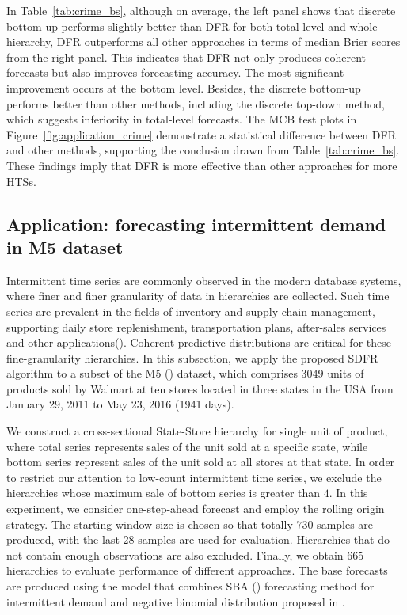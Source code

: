 \documentclass[a4paper,review,12pt,authoryear]{elsarticle}
\theoremstyle{definition}
\begin{document}
     In Table~\ref{tab:crime_bs},  although on average, the left panel shows that discrete bottom-up performs slightly better than DFR for both total level and whole hierarchy, DFR outperforms all other approaches in terms of median Brier scores from the right panel. This indicates that DFR not only produces coherent forecasts but also improves forecasting accuracy. The most significant improvement occurs at the bottom level. Besides, the discrete bottom-up performs better than other methods, including the discrete top-down method, which suggests inferiority in total-level forecasts. The MCB test plots in Figure~\ref{fig:application_crime} demonstrate a statistical difference between DFR and other methods, supporting the conclusion drawn from Table~\ref{tab:crime_bs}. These findings imply that DFR is more effective than other approaches for more HTSs.

     \subsection{Application: forecasting intermittent demand in M5 dataset}

     Intermittent time series are commonly observed in the modern database systems, where finer and finer granularity of data in hierarchies are collected. 
     Such time series are prevalent in the fields of inventory and supply chain management, supporting daily store replenishment, transportation plans, after-sales services and other applications(\citealp{babaiDemandForecastingSupply2022}).
     Coherent predictive distributions are critical for these fine-granularity hierarchies. 
     In this subsection, we apply the proposed SDFR algorithm to a subset of the M5 (\citealp{makridakisM5AccuracyCompetition2022}) dataset, which comprises $3049$ units of products sold by Walmart at ten stores located in three states in the USA from January 29, 2011 to May 23, 2016 (1941 days).
     
    We construct a cross-sectional State-Store hierarchy for single unit of product, where total series represents sales of the unit sold at a specific state, while bottom series represent sales of the unit sold at all stores at that state. 
    In order to restrict our attention to low-count intermittent time series, we exclude the hierarchies whose maximum sale of bottom series is greater than $4$. 
    In this experiment, we consider one-step-ahead forecast and employ the rolling origin strategy. The starting window size is chosen so that totally $730$ samples are produced, with the last $28$ samples are used for evaluation.
    Hierarchies that do not contain enough observations are also excluded.
    Finally, we obtain $665$ hierarchies to evaluate performance of different approaches. 
    The base forecasts are produced using the model that combines SBA (\citealp{syntetosAccuracyIntermittentDemand2005}) forecasting method for intermittent demand and negative binomial distribution proposed in \cite{kolassaEvaluatingPredictiveCount2016}.
\end{document}
